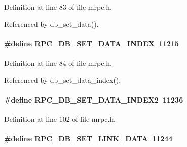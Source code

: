 Definition at line 83 of file mrpc.h.

Referenced by db\_\-set\_\-data().
\paragraph[{RPC\_\-DB\_\-SET\_\-DATA\_\-INDEX}]{\setlength{\rightskip}{0pt plus 5cm}\#define RPC\_\-DB\_\-SET\_\-DATA\_\-INDEX~11215}\hfill\label{group__mrpcdefineh_ga071b7fc015474387c30d1fcc7193f486}

\begin{DoxyItemize}
\item 
\end{DoxyItemize}

Definition at line 84 of file mrpc.h.

Referenced by db\_\-set\_\-data\_\-index().
\paragraph[{RPC\_\-DB\_\-SET\_\-DATA\_\-INDEX2}]{\setlength{\rightskip}{0pt plus 5cm}\#define RPC\_\-DB\_\-SET\_\-DATA\_\-INDEX2~11236}\hfill\label{group__mrpcdefineh_gaede33e3680ff32d184b45c57f19ea0a2}

\begin{DoxyItemize}
\item 
\end{DoxyItemize}

Definition at line 102 of file mrpc.h.
\paragraph[{RPC\_\-DB\_\-SET\_\-LINK\_\-DATA}]{\setlength{\rightskip}{0pt plus 5cm}\#define RPC\_\-DB\_\-SET\_\-LINK\_\-DATA~11244}\hfill\label{group__mrpcdefineh_ga90e804c905002f3ab32f9eb2106103fb}

\begin{DoxyItemize}
\item 
\end{DoxyItemize}

